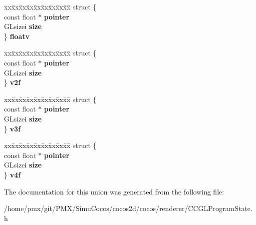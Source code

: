 \begin{DoxyCompactItemize}
\begin{tabbing}
\end{tabbing}\item 
\mbox{\label{unionUniformValue_1_1U_af733201beb33342c904ad87d5c938ff9}} 
\begin{tabbing}
xx\=xx\=xx\=xx\=xx\=xx\=xx\=xx\=xx\=\kill
struct \{\\
\>const float $\ast$ {\bfseries pointer}\\
\>GLsizei {\bfseries size}\\
\} {\bfseries floatv}\\

\end{tabbing}\item 
\mbox{\label{unionUniformValue_1_1U_a45208275c1a7bc1c81814941f66d3580}} 
\begin{tabbing}
xx\=xx\=xx\=xx\=xx\=xx\=xx\=xx\=xx\=\kill
struct \{\\
\>const float $\ast$ {\bfseries pointer}\\
\>GLsizei {\bfseries size}\\
\} {\bfseries v2f}\\

\end{tabbing}\item 
\mbox{\label{unionUniformValue_1_1U_aadd9469427bd943b4d749e9f8ac299f5}} 
\begin{tabbing}
xx\=xx\=xx\=xx\=xx\=xx\=xx\=xx\=xx\=\kill
struct \{\\
\>const float $\ast$ {\bfseries pointer}\\
\>GLsizei {\bfseries size}\\
\} {\bfseries v3f}\\

\end{tabbing}\item 
\mbox{\label{unionUniformValue_1_1U_a3d977222e7b401342efcc84668c598c2}} 
\begin{tabbing}
xx\=xx\=xx\=xx\=xx\=xx\=xx\=xx\=xx\=\kill
struct \{\\
\>const float $\ast$ {\bfseries pointer}\\
\>GLsizei {\bfseries size}\\
\} {\bfseries v4f}\\

\end{tabbing}\end{DoxyCompactItemize}


The documentation for this union was generated from the following file\+:\begin{DoxyCompactItemize}
\item 
/home/pmx/git/\+P\+M\+X/\+Simu\+Cocos/cocos2d/cocos/renderer/C\+C\+G\+L\+Program\+State.\+h\end{DoxyCompactItemize}
